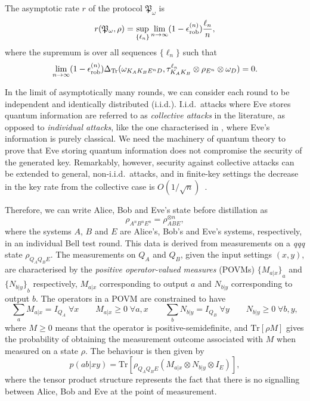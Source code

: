 \documentclass[10pt, a4paper]{article}
\numberwithin{equation}{section} %
\theoremstyle{definition}
\theoremstyle{plain}
\newcommand{\?}{\mathrel{?}} %
\newcommand{\Tr}{\mathrm{Tr}} %
\newcommand{\rob}{\rm rob}
\newcommand{\erob}[1]{\epsilon_{\rob}^{(#1)}}
\begin{document}
    The asymptotic rate \(r\) of the protocol \(\mathfrak{P}_{\omega}\) is~\cite{CQKeyDistill}
    \begin{equation}
      r(\mathfrak{P}_{\omega}, \rho) = \sup_{\{\ell_n\}} \lim_{n\to\infty} (1-\erob{n}) \frac{\ell_n}{n},
    \end{equation}
    where the supremum is over all sequences \(\{\ell_n\}\) such that
    \[ \lim_{n\to\infty} (1-\erob{n})\Delta_{\Tr}(\omega_{K_A K_B E^n D}, \tau_{K_A K_B}^{\ell_n} \otimes \rho_{E^n} \otimes \omega_{D}) = 0. \]

    In the limit of asymptotically many rounds, we can consider each round to be independent and identically distributed (i.i.d.). I.i.d.\ attacks where Eve stores quantum information are referred to as \emph{collective attacks} in the literature, as opposed to \emph{individual attacks}, like the one characterised in , where Eve's information is purely classical. We need the machinery of quantum theory to prove that Eve storing quantum information does not compromise the security of the generated key. Remarkably, however, security against collective attacks can be extended to general, non-i.i.d.\ attacks, and in finite-key settings the decrease in the key rate from the collective case is \(O(1/\sqrt{n})\)~\cite{DI_Proofs, DIQKD_PracticalEAT}.

    Therefore, we can write Alice, Bob and Eve's state before distillation as
    \[ \rho_{A^n B^n E^n} = \rho_{ABE}^{\otimes n}, \]
    where the systems \(A\), \(B\) and \(E\) are Alice's, Bob's and Eve's systems, respectively, in an individual Bell test round. This data is derived from measurements on a \emph{qqq} state \(\rho_{Q_A Q_B E}\). The measurements on \(Q_A\) and \(Q_B\), given the input settings \((x,y)\), are characterised by the \emph{positive operator-valued measures} (POVMs)  \({\{M_{a|x}\}}_{a}\) and \({\{N_{b|y}\}}_{b}\) respectively, \(M_{a|x}\) corresponding to output \(a\) and \(N_{b|y}\) corresponding to output \(b\). The operators in a POVM are constrained to have
    \[ \sum_{a} M_{a|x} = I_{Q_A}\;\forall x \qquad M_{a|x} \geq 0\;\forall a, x \qquad \sum_{b} N_{b|y} = I_{Q_B}\;\forall y \qquad N_{b|y} \geq 0\;\forall b, y, \]
    where \(M \geq 0\) means that the operator is positive-semidefinite, and \(\Tr\left[\rho M\right]\) gives the probability of obtaining the measurement outcome associated with \(M\) when measured on a state \(\rho\). The behaviour is then given by
    \begin{equation}\label{eqn:probmeas}
      p(ab|xy) = \Tr\left[\rho_{Q_A Q_B E} \left(M_{a|x} \otimes N_{b|y} \otimes I_{E}\right) \right],
    \end{equation}
    where the tensor product structure represents the fact that there is no signalling between Alice, Bob and Eve at the point of measurement.
\end{document}
